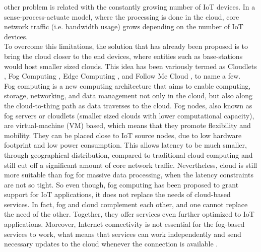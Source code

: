 other problem is related with the constantly growing number of IoT devices. In a
sense-process-actuate model, where the processing is done in the cloud, core
network traffic (i.e. bandwidth usage) grows depending on the number of IoT
devices.\\
\noindent\tab To overcome this limitations, the solution that has already been
proposed is to bring the cloud closer to the end devices, where entities such as
base-stations would host smaller sized clouds. This idea has been variously
termed as Cloudlets \cite{satyanarayanan2013cloudlets}, Fog Computing
\cite{bonomi2012fog}, Edge Computing \cite{davy2014challenges}, and Follow Me
Cloud \cite{taleb2013follow}, to name a few.\\
\noindent\tab Fog computing is a new computing architecture that aims to enable
computing, storage, networking, and data management not only in the cloud, but
also along the cloud-to-thing path as data traverses to the cloud. Fog nodes,
also known as fog servers or cloudlets (smaller sized clouds with lower
computational capacity), are virtual-machine (VM) based, which means that they
promote flexibility and mobility. They can be placed close to IoT source nodes,
due to low hardware footprint and low power consumption. This allows latency to
be much smaller, through geographical distribution, compared to traditional
cloud computing and still cut off a significant amount of core network traffic.
Nevertheless, cloud is still more suitable than fog for massive data processing,
when the latency constraints are not so tight. So even though, fog computing has
been proposed to grant support for IoT applications, it does not replace the
needs of cloud-based services. In fact, fog and cloud complement each other, and
one cannot replace the need of the other. Together, they offer services even
further optimized to IoT applications. Moreover, Internet connectivity is not
essential for the fog-based services to work, what means that services can work
independently and send necessary updates to the cloud whenever the connection is
available \cite{yousefpour2018all}.

